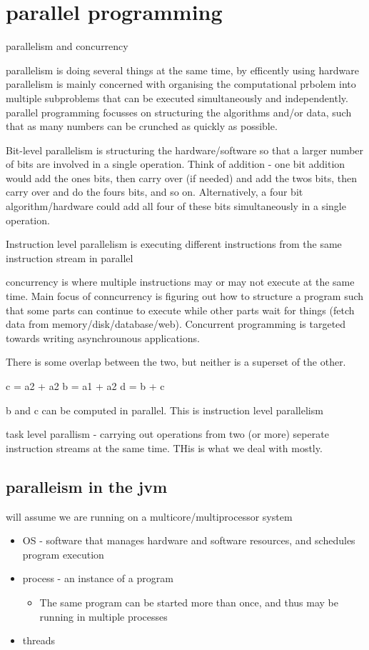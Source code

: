 \chapter{parallel programming}

parallelism and concurrency

parallelism is doing several things at the same time, by efficently using hardware
parallelism is mainly concerned with organising the computational prbolem into multiple subproblems that can be executed simultaneously and independently.
parallel programming focusses on structuring the algorithms and/or data, such that as many numbers can be crunched as quickly as possible.

Bit-level parallelism is structuring the hardware/software so that a larger number of bits are involved in a single operation. Think of addition - one bit addition would add the ones bits, then carry over (if needed) and add the twos bits, then carry over and do the fours bits, and so on. Alternatively, a four bit algorithm/hardware could add all four of these bits simultaneously in a single operation.

Instruction level parallelism is executing different instructions from the same instruction stream in parallel

concurrency is where multiple instructions may or may not execute at the same time.
Main focus of conncurrency is figuring out how to structure a program such that some parts can continue to execute while other parts wait for things (fetch data from memory/disk/database/web). Concurrent programming is targeted towards writing asynchrounous applications.

There is some overlap between the two, but neither is a superset of the other.


c = a2 + a2
b = a1 + a2
d = b + c

b and c can be computed in parallel. This is instruction level parallelism

task level parallism - carrying out operations from two (or more) seperate instruction streams at the same time.
THis is what we deal with mostly.

\section{paralleism in the jvm}

will assume we are running on a multicore/multiprocessor system

\begin{itemize}
    \item OS - software that manages hardware and software resources, and schedules program execution
    \item process - an instance of a program
    \begin{itemize}
        \item The same program can be started more than once, and thus may be running in multiple processes
    \end{itemize}
    \item threads

\end{itemize}

